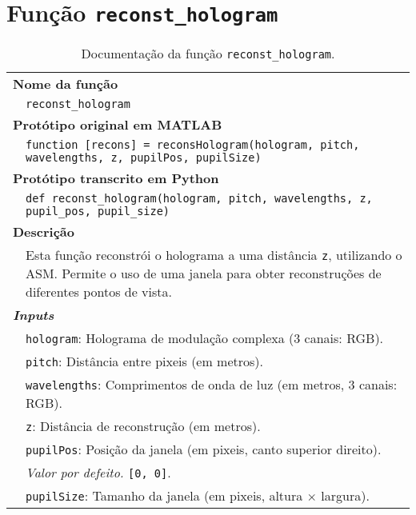 \newpage
\section{Função \texttt{reconst\_hologram}}
\label{sec::doc-codigo:reconst_hologram}

\begin{table}[!hp]
    \centering
    \caption[Documentação da função \texttt{reconst\_hologram}]{Documentação da função \texttt{reconst\_hologram}\cite{Gilles2018}.}
    \label{tab:reconst_hologram}
    \begin{tabular}{p{1cm} p{11.5cm}}
        \hline
        \multicolumn{2}{l}{\bfseries\small Nome da função}\\
         & \verb|reconst_hologram|\\
        \hline
        \multicolumn{2}{l}{\bfseries\small Protótipo original em MATLAB}\\
         & \texttt{function [recons] = reconsHologram(hologram, pitch, wavelengths, z, pupilPos, pupilSize)
         }\\
        \hline
        \multicolumn{2}{l}{\bfseries\small Protótipo transcrito em Python}\\
         & \texttt{def reconst_hologram(hologram, pitch, wavelengths, z, pupil_pos, pupil_size)} \\
        \hline\multicolumn{2}{l}{\bfseries\small Descrição}\\
         & Esta função reconstrói o holograma a uma distância \verb|z|, utilizando o \ac{ASM}. Permite o uso de uma janela para obter reconstruções de diferentes pontos de vista.\\
        \hline\multicolumn{2}{l}{\bfseries\small \textit{Inputs}}\\
         & \verb|hologram|: Holograma de modulação complexa (3 canais: \ac{RGB}). \\
         & \verb|pitch|: Distância entre pixeis (em metros).\\
         & \verb|wavelengths|: Comprimentos de onda de luz (em metros, 3 canais: \ac{RGB}).\\
         & \verb|z|: Distância de reconstrução (em metros).\\
         & \verb|pupilPos|: Posição da janela (em pixeis, canto superior direito).\\
         & \hspace{1cm} \textit{Valor por defeito.} \verb|[0, 0]|.\\
         & \verb|pupilSize|: Tamanho da janela (em pixeis, altura $\times$ largura).\\

\end{tabular}
\end{table}
